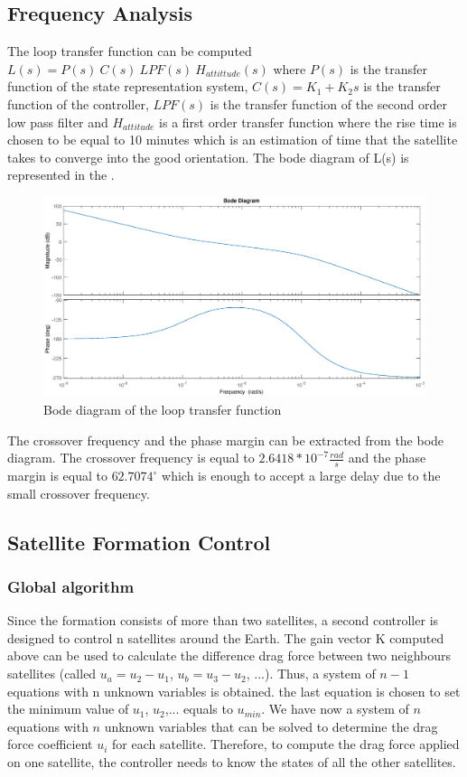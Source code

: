  \subsection{Frequency Analysis}
The loop transfer function can be computed $L(s) = P(s) \ C(s) \ LPF(s) \ H_{attittude}(s)$ where $P(s)$ is the transfer function of the state representation system, $C(s) = K_1 + K_2 s$ is the transfer function of the controller, $LPF(s)$ is the transfer function of the second order low pass filter and $H_{attitude}$ is a first order transfer function where the rise time is chosen to be equal to 10 minutes which is an estimation of time that the satellite takes to converge into the good orientation.
The bode diagram of L(s) is represented in the . \\
\begin{figure}[H]
	\centering
	\includegraphics[width=0.9\linewidth]
	{figures/Bode_L.eps}
	\caption{Bode diagram of the loop transfer function}
	\label{fig:Bode_L}
\end{figure}
The crossover frequency and the phase margin can be extracted from the bode diagram. The crossover frequency is equal to $2.6418*10^{-7}\frac{rad}{s}$ and the phase margin is equal to $62.7074^{\circ}$ which is enough to accept a large delay due to the small crossover frequency. 
 
\subsection{Satellite Formation Control} 
\subsubsection{Global algorithm}
Since the formation consists of more than two satellites, a second controller is designed to control n satellites around the Earth. The gain vector K computed above can be used to calculate the difference drag force between two neighbours satellites (called $u_a = u_2 - u_1$, $u_b = u_3 - u_2$, ...). Thus, a system of $n-1$ equations with n unknown variables is obtained. the last equation is chosen to set the minimum value of $u_1$, $u_2$,... equals to $u_{min}$. We have now a system of $n$ equations with $n$ unknown variables that can be solved to determine the drag force coefficient $u_i$ for each satellite. Therefore, to compute the drag force applied on one satellite, the controller needs to know the states of all the other satellites.
